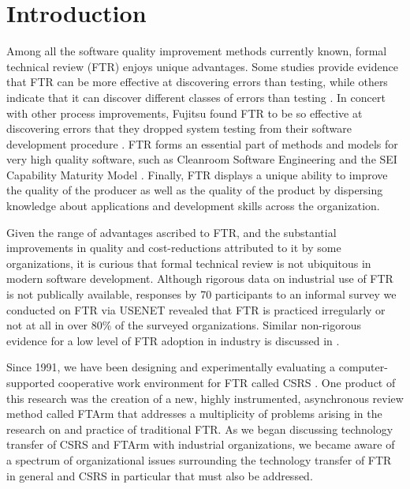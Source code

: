 \pagestyle{empty}
\thispagestyle{empty}

\section{Introduction}

Among all the software quality improvement methods currently known, formal
technical review 
%
(FTR)
%
enjoys unique advantages.  Some studies provide evidence that FTR can be
more effective at discovering errors than testing, while others indicate
that it can discover different classes of errors than testing
\cite{Myers78,Basili86}.  In concert with other process improvements,
Fujitsu found FTR to be so effective at discovering errors that they
dropped system testing from their software development procedure
\cite{Arthur93}.  FTR forms an essential part of methods and models for
very high quality software, such as Cleanroom Software Engineering
\cite{Linger93} and the SEI Capability Maturity Model \cite{Paulk93a}.
Finally, FTR displays a unique ability to improve the quality of the
producer as well as the quality of the product by dispersing knowledge
about applications and development skills across the organization.

Given the range of advantages ascribed to FTR, and the substantial
improvements in quality and cost-reductions attributed to it by some
organizations, it is curious that formal technical review is not ubiquitous
in modern software development.  Although rigorous data on industrial use
of FTR is not publically available, responses by 70 participants to an
informal survey we conducted on FTR via USENET revealed that FTR is
 practiced irregularly or not at all in over 80\% of the surveyed
organizations.  Similar non-rigorous evidence for a low level of FTR
adoption in industry is discussed in \cite{Brykczynski94}.

Since 1991, we have been designing and experimentally evaluating a
computer-supported cooperative work environment for FTR called CSRS
\cite{Johnson94,Johnson93,Johnson93b}.  One product of this research was
the creation of a new, highly instrumented, asynchronous review method
called FTArm that addresses a multiplicity of problems arising in the
research on and practice of traditional FTR.  As we began discussing
technology transfer of CSRS and FTArm with industrial organizations, we
became aware of a spectrum of organizational issues surrounding the
technology transfer of FTR in general and CSRS in particular that must also
be addressed.

